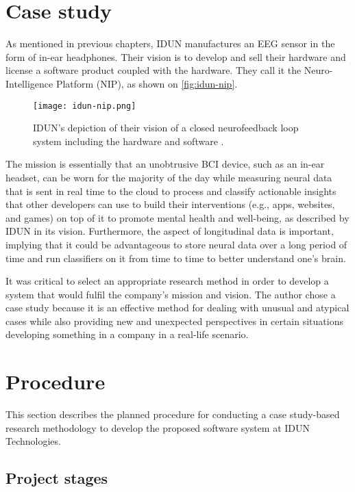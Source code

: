 \section{Case study}
\label{chapter3-case-study}

As mentioned in previous chapters, IDUN manufactures an EEG sensor in the form of in-ear headphones. Their vision is to develop and sell their hardware and license a software product coupled with the hardware. They call it the Neuro-Intelligence Platform (NIP), as shown on \autoref{fig:idun-nip}.

\begin{figure}[!ht]
  \centering
  \texttt{[image: idun-nip.png]}
  \caption{IDUN's depiction of their vision of a closed neurofeedback loop system including the hardware and software \citep{idun_guardian_nodate}.}
  \label{fig:idun-nip}
\end{figure}

The mission is essentially that an unobtrusive BCI device, such as an in-ear headset, can be worn for the majority of the day while measuring neural data that is sent in real time to the cloud to process and classify actionable insights that other developers can use to build their interventions (e.g., apps, websites, and games) on top of it to promote mental health and well-being, as described by IDUN in its vision. Furthermore, the aspect of longitudinal data is important, implying that it could be advantageous to store neural data over a long period of time and run classifiers on it from time to time to better understand one's brain.

It was critical to select an appropriate research method in order to develop a system that would fulfil the company's mission and vision. The author chose a case study because it is an effective method for dealing with unusual and atypical cases while also providing new and unexpected perspectives in certain situations developing something in a company in a real-life scenario.

\section{Procedure}
\label{chapter3-procedure}

This section describes the planned procedure for conducting a case study-based research methodology to develop the proposed software system at IDUN Technologies.

\subsection{Project stages}
\label{chapter3-project-stages}

